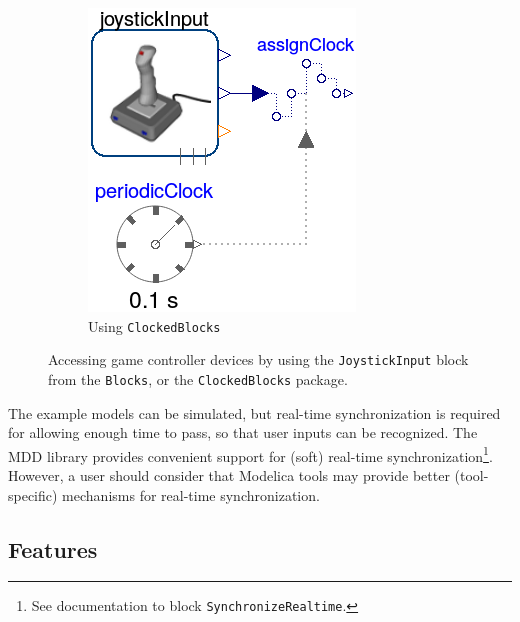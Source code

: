 \documentclass{resources/modelica}
\newcommand{\modelica}[1]{\lstinline[language=modelica]|#1|}
\begin{document}
\begin{figure}[htb]
\begin{subfigure}[b]{0.45\columnwidth}
          \includegraphics[width=\textwidth]{figures/MDDJoystickClocked}
          \caption{Using \modelica{ClockedBlocks}}
          \label{fig:MDDJoystickClocked}
  \end{subfigure}
  \caption{Accessing game controller devices by using the
  \modelica{JoystickInput} block from the \modelica{Blocks}, or the
  \modelica{ClockedBlocks} package.}
  \label{fig:JoystickBlocks}
\end{figure}

The example models can be simulated, but real-time synchronization is
required for allowing enough time to pass, so that user inputs can be
recognized.
The MDD library provides convenient support for (soft) real-time
synchronization\footnote{See documentation to block
\mbox{\modelica{SynchronizeRealtime}.}
}.
However, a user should consider that Modelica tools may provide better (tool-specific) mechanisms for real-time synchronization.

\subsection{Features}
\end{document}
